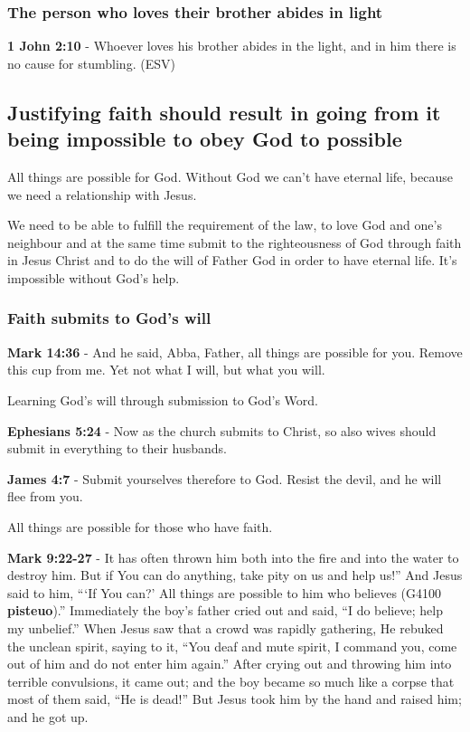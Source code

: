 \documentclass[11pt]{article}
\begin{document}
\subsubsection{The person who loves their brother abides in light}
\label{sec:orgf3c35e4}
\textbf{1 John 2:10} - Whoever loves his brother abides in the light, and in him there is no cause for stumbling.  (ESV)

\subsection{Justifying faith should result in going from it being impossible to obey God to possible}
\label{sec:org4616fe9}
All things are possible for God.
Without God we can't have eternal life, because we need a relationship with Jesus.

We need to be able to fulfill the requirement
of the law, to love God and one's neighbour and at the same time
submit to the righteousness of God through faith in Jesus
Christ and to do the will of Father God in
order to have eternal life. It's impossible without God's help.

\subsubsection{Faith submits to God's will}
\label{sec:org37427a1}
\textbf{Mark 14:36} - And he said, Abba, Father, all things are possible for you. Remove this cup from me. Yet not what I will, but what you will.

Learning God's will through submission to God's Word.

\textbf{Ephesians 5:24} - Now as the church submits to Christ, so also wives should submit in everything to their husbands.

\textbf{James 4:7} - Submit yourselves therefore to God. Resist the devil, and he will flee from you.

All things are possible for those who have faith.

\textbf{Mark 9:22-27} - It has often thrown him both into the fire and into the water to destroy him. But if You can do anything, take pity on us and help us!” And Jesus said to him, “‘If You can?’ All things are possible to him who believes (G4100 \textbf{pisteuo}).” Immediately the boy’s father cried out and said, “I do believe; help my unbelief.” When Jesus saw that a crowd was rapidly gathering, He rebuked the unclean spirit, saying to it, “You deaf and mute spirit, I command you, come out of him and do not enter him again.” After crying out and throwing him into terrible convulsions, it came out; and the boy became so much like a corpse that most of them said, “He is dead!” But Jesus took him by the hand and raised him; and he got up.
\end{document}

